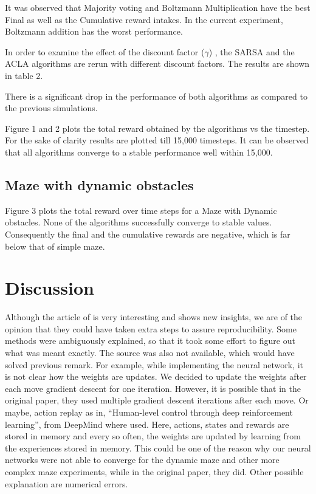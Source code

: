 \documentclass[letterpaper]{article}
\begin{document}
It was observed that Majority voting and Boltzmann Multiplication have
the best Final as well as the Cumulative reward intakes. In the current
experiment, Boltzmann addition has the worst performance.

In order to examine the effect of the discount factor (\(\gamma\)) , the
SARSA and the ACLA algorithms are rerun with different discount factors.
The results are shown in table 2.

 There is a significant drop in the performance of both algorithms as
compared to the previous simulations.

Figure 1 and 2 plots the total reward obtained by the algorithms vs the
timestep. For the sake of clarity results are plotted till 15,000
timesteps. It can be observed that all algorithms converge to a stable
performance well within 15,000.

\subsection{Maze with dynamic
obstacles}\label{maze-with-dynamic-obstacles-1}

Figure 3 plots the total reward over time steps for a Maze with Dynamic
obstacles. None of the algorithms successfully converge to stable
values. Consequently the final and the cumulative rewards are negative,
which is far below that of simple maze.

\section{Discussion}\label{discussion}

Although the article of \cite{wiering2008} is very interesting and shows new
insights, we are of the opinion that they could have taken extra steps
to assure reproducibility. Some methods were ambiguously explained, so
that it took some effort to figure out what was meant exactly. The
source was also not available, which would have solved previous remark.
For example, while implementing the neural network, it is not clear how
the weights are updates. We decided to update the weights after each
move gradient descent for one iteration. However, it is possible that in
the original paper, they used multiple gradient descent iterations after
each move. Or maybe, action replay as in, ``Human-level control through
deep reinforcement learning'', from DeepMind where used. Here, actions,
states and rewards are stored in memory and every so often, the weights
are updated by learning from the experiences stored in memory. This
could be one of the reason why our neural networks were not able to
converge for the dynamic maze and other more complex maze experiments,
while in the original paper, they did. Other possible explanation are
numerical errors.
\end{document}
